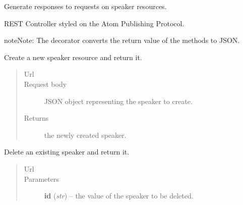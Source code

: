\documentclass[letterpaper,10pt,english]{sphinxmanual}
\begin{document}
\begin{fulllineitems}
\label{api:onlinelinguisticdatabase.controllers.speakers.SpeakersController}
Generate responses to requests on speaker resources.

REST Controller styled on the Atom Publishing Protocol.

\begin{notice}{note}{Note:}
The  decorator converts the return value of the methods to
JSON.
\end{notice}

\begin{fulllineitems}
\label{api:onlinelinguisticdatabase.controllers.speakers.SpeakersController.create}
Create a new speaker resource and return it.
\begin{quote}\begin{description}
\item[{Url }] \leavevmode
{}

\item[{Request body}] \leavevmode
JSON object representing the speaker to create.

\item[{Returns}] \leavevmode
the newly created speaker.

\end{description}\end{quote}

\end{fulllineitems}


\begin{fulllineitems}
\label{api:onlinelinguisticdatabase.controllers.speakers.SpeakersController.delete}
Delete an existing speaker and return it.
\begin{quote}\begin{description}
\item[{Url }] \leavevmode
{}

\item[{Parameters}] \leavevmode
\textbf{id} (\emph{str}) -- the  value of the speaker to be deleted.


\end{description}
\end{quote}
\end{fulllineitems}
\end{fulllineitems}
\end{document}

